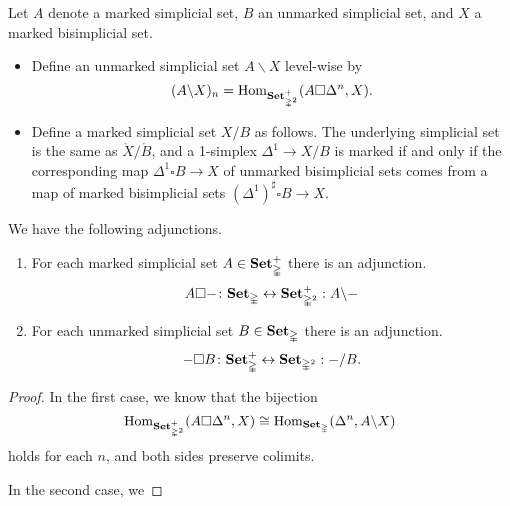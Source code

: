 \documentclass[main.tex]{subfiles}
\begin{document}
\begin{definition}
  Let $A$ denote a marked simplicial set, $B$ an unmarked simplicial set, and $X$ a marked bisimplicial set.
  \begin{itemize}
    \item Define an unmarked simplicial set $A \backslash X$ level-wise by
      \begin{equation*}
        (A \backslash X)_{n} = \mathrm{Hom}_{\mathbf{Set}_{\mathbb{\Delta}^{2}}^{+}}(A \square \Delta^{n}, X).
      \end{equation*}

    \item Define a marked simplicial set $X / B$ as follows. The underlying simplicial set is the same as $\mathring{X} / \mathring{B}$, and a 1-simplex $\Delta^{1} \to X / B$ is marked if and only if the corresponding map $\Delta^{1} \square B \to X$ of unmarked bisimplicial sets comes from a map of marked bisimplicial sets $(\Delta^{1})^{\sharp} \square B \to X$.
  \end{itemize}
\end{definition}

\begin{proposition}
  We have the following adjunctions.

  \begin{enumerate}
    \item For each marked simplicial set $A \in \mathbf{Set}_{\mathbb{\Delta}}^{+}$ there is an adjunction.
      \begin{equation*}
        A \square -\colon \mathbf{Set}_{\mathbb{\Delta}} \leftrightarrow \mathbf{Set}_{\mathbb{\Delta}^{2}}^{+} : A \backslash -
      \end{equation*}

    \item For each unmarked simplicial set $B \in \mathbf{Set}_{\mathbb{\Delta}}$ there is an adjunction.
      \begin{equation*}
        - \square B\colon \mathbf{Set}_{\mathbb{\Delta}}^{+} \leftrightarrow \mathbf{Set}_{\mathbb{\Delta}^{2}} : - / B.
      \end{equation*}
  \end{enumerate}
\end{proposition}
\begin{proof}
  In the first case, we know that the bijection
  \begin{equation*}
    \mathrm{Hom}_{\mathbf{Set}_{\mathbb{\Delta}^{2}}^{+}}(A \square \Delta^{n}, X) \cong \mathrm{Hom}_{\mathbf{Set}_{\mathbb{\Delta}}}(\Delta^{n}, A \backslash X)
  \end{equation*}
  holds for each $n$, and both sides preserve colimits.

  In the second case, we
\end{proof}
\end{document}
